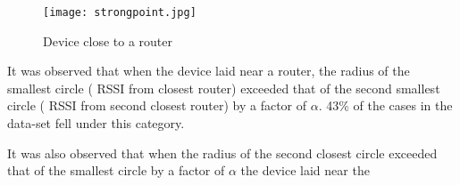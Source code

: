 \documentclass[twocolumn, 11pt]{IEEEtran}
\begin{document}


\begin{figure}[ht!]
\centering
\texttt{[image: strongpoint.jpg]}
\caption{ Device close to a router \label{overflow}}
\end{figure}


It was observed that when the device laid near a router, the radius of the smallest circle ( RSSI from closest router) exceeded that of the second smallest circle ( RSSI from second closest router) by a factor of $\alpha$. 43\% of the cases in the data-set fell under this category.

It was also observed that when the radius of the second closest circle exceeded that of the smallest circle by a factor of $\alpha$ the device laid near the 


 
\end{document}

